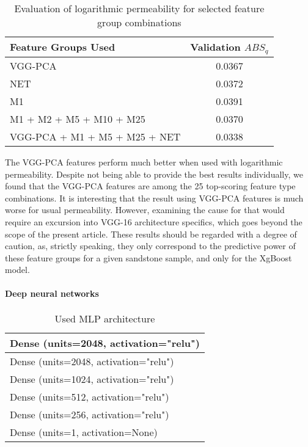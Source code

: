 \documentclass[review]{elsarticle}
\begin{document}
\begin{table}[H]
  \centering
  \caption{Evaluation of logarithmic permeability for selected feature group combinations} \label{tab:tab4}
  \begin{tabular}{ | l | c | }
    \hline
    Feature Groups Used & Validation $ABS_q$ \\ \hline
    VGG-PCA & 0.0367 \\ \hline
    NET & 0.0372 \\ \hline
    M1 & 0.0391 \\ \hline
    M1 + M2 + M5 + M10 + M25 & 0.0370 \\ \hline
    VGG-PCA + M1 + M5 + M25 + NET & 0.0338 \\ \hline
  \end{tabular}
\end{table} 

The VGG-PCA features perform much better when used with logarithmic permeability. Despite not being able to provide the best results individually, we found that the VGG-PCA features are among the 25 top-scoring feature type combinations. It is interesting that the result using VGG-PCA features is much worse for usual permeability. However, examining the cause for that would require an excursion into VGG-16 architecture specifics, which goes beyond the scope of the present article.
These results should be regarded with a degree of caution, as, strictly speaking, they only correspond to the predictive power of these feature groups for a given sandstone sample, and only for the XgBoost model.

\paragraph{Deep neural networks}

\setlength\intextsep{0pt}
\begin{wraptable}[8]{r}{0.55\textwidth}
  \centering
  \caption{Used MLP architecture}\label{tab:tab5}
  \begin{tabular}{ | l |}
    \hline
    Dense (units=2048, activation="relu") \\ \hline
    Dense (units=2048, activation="relu") \\ \hline
    Dense (units=1024, activation="relu") \\ \hline
    Dense (units=512, activation="relu") \\ \hline
    Dense (units=256, activation="relu") \\ \hline
    Dense (units=1, activation=None) \\ \hline
  \end{tabular}
\end{wraptable} 
\end{document}
